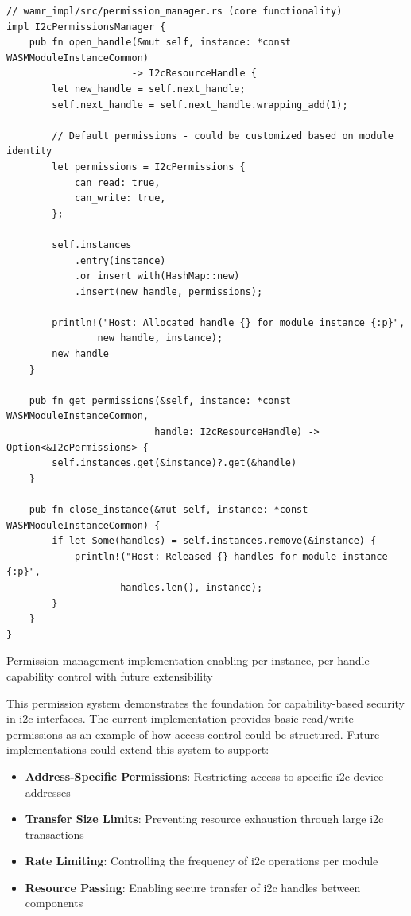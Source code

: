 \begin{listing}[H]
\begin{verbatim}
// wamr_impl/src/permission_manager.rs (core functionality)
impl I2cPermissionsManager {
    pub fn open_handle(&mut self, instance: *const WASMModuleInstanceCommon) 
                      -> I2cResourceHandle {
        let new_handle = self.next_handle;
        self.next_handle = self.next_handle.wrapping_add(1);
        
        // Default permissions - could be customized based on module identity
        let permissions = I2cPermissions {
            can_read: true,
            can_write: true,
        };
        
        self.instances
            .entry(instance)
            .or_insert_with(HashMap::new)
            .insert(new_handle, permissions);
            
        println!("Host: Allocated handle {} for module instance {:p}", 
                new_handle, instance);
        new_handle
    }

    pub fn get_permissions(&self, instance: *const WASMModuleInstanceCommon, 
                          handle: I2cResourceHandle) -> Option<&I2cPermissions> {
        self.instances.get(&instance)?.get(&handle)
    }

    pub fn close_instance(&mut self, instance: *const WASMModuleInstanceCommon) {
        if let Some(handles) = self.instances.remove(&instance) {
            println!("Host: Released {} handles for module instance {:p}", 
                    handles.len(), instance);
        }
    }
}
\end{verbatim}
\caption{Permission management implementation enabling per-instance, per-handle capability control with future extensibility}
\label{lst:permission-implementation}
\end{listing}

This permission system demonstrates the foundation for capability-based security in \acrshort{i2c} interfaces. The current implementation provides basic read/write permissions as an example of how access control could be structured. Future implementations could extend this system to support:

\begin{itemize}
    \item \textbf{Address-Specific Permissions}: Restricting access to specific \acrshort{i2c} device addresses
    \item \textbf{Transfer Size Limits}: Preventing resource exhaustion through large \acrshort{i2c} transactions
    \item \textbf{Rate Limiting}: Controlling the frequency of \acrshort{i2c} operations per module
    \item \textbf{Resource Passing}: Enabling secure transfer of \acrshort{i2c} handles between components
\end{itemize}

